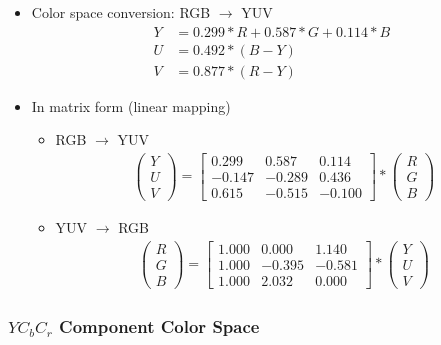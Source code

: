 \documentclass{scrartcl}
\begin{document}
\begin{itemize}
	\item Color space conversion: RGB $ \rightarrow $ YUV
	\begin{align*}
		Y &= 0.299*R+0.587*G+0.114*B \\
		U &= 0.492*(B-Y) \\
		V &= 0.877*(R-Y)
	\end{align*}
	\item In matrix form (linear mapping)
	\begin{itemize}
		\item RGB $ \rightarrow $ YUV
		\begin{align*}
			\begin{pmatrix}
				Y \\
				U \\
				V
			\end{pmatrix} = \begin{bmatrix}
				0.299 & 0.587 & 0.114 \\
				-0.147 & -0.289 & 0.436 \\
				0.615 & -0.515 & -0.100
			\end{bmatrix} * \begin{pmatrix}
				R \\
				G \\
				B
			\end{pmatrix}
		\end{align*}
		\item YUV $ \rightarrow $ RGB
		\begin{align*}
			\begin{pmatrix}
				R \\
				G \\
				B
			\end{pmatrix} = \begin{bmatrix}
				1.000 & 0.000 & 1.140 \\
				1.000 & -0.395 & -0.581 \\
				1.000 & 2.032 & 0.000
			\end{bmatrix} * \begin{pmatrix}
				Y \\
				U \\
				V
			\end{pmatrix}
		\end{align*}
	\end{itemize}
\end{itemize}

\subsubsection{$ YC_bC_r $ Component Color Space}
\end{document}
